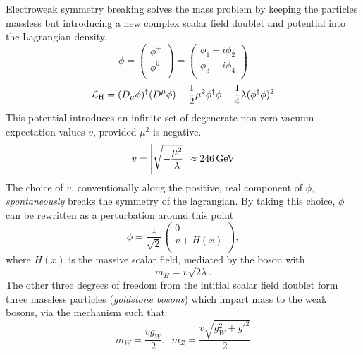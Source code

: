 Electroweak symmetry breaking solves the mass problem by keeping the particles massless but introducing a new complex scalar field doublet and potential into the Lagrangian density.
\begin{equation}
	\phi = 
\begin{pmatrix} 
	\phi^{+} \\
	\phi^{0} \\
\end{pmatrix}
	= 
\begin{pmatrix} 
	\phi_1+i\phi_2 \\
	\phi_3+i\phi_4 \\
\end{pmatrix}
\end{equation}
\begin{equation}
\mathcal{L}_{\mathrm{H}}=(D_{\mu}\phi)^{\dagger}(D^{\mu}\phi)-\frac{1}{2}\mu^{2}\phi^{\dagger}\phi - \frac{1}{4}\lambda(\phi^{\dagger}\phi)^{2}
\end{equation}
This potential introduces an infinite set of degenerate non-zero vacuum expectation values $v$, provided $\mu^{2}$ is negative.
\begin{equation}
	v=\left|\sqrt{-\frac{\mu^2}{\lambda}}\right|\approx246\,\text{Ge\hspace{-.08em}V}
\end{equation} 
The choice of $v$, conventionally along the positive, real component of $\phi$, \textit{spontaneously} breaks the symmetry of the lagrangian.
By taking this choice, $\phi$ can be rewritten as a perturbation around this point
\begin{equation}
	\phi = \frac{1}{\sqrt{2}}
\begin{pmatrix} 
	0 \\
	v + H(x) \\
\end{pmatrix},
\end{equation}
where $H(x)$ is the massive \BEH{} scalar field, mediated by the \Hboson{} boson with
\begin{equation}
	m_{H} = v\sqrt{2\lambda}.
\end{equation}
The other three degrees of freedom from the intitial scalar field doublet form three massless particles (\textit{goldstone bosons}) which impart mass to the weak bosons, via the \BEH{} mechanism such that:
\begin{equation}
	m_{W} = \frac{vg_{W}}{2},
	\,\,\,
	m_{Z} = \frac{v\sqrt{g_{W}^{2}+g'^{2}}}{2}
\end{equation}

